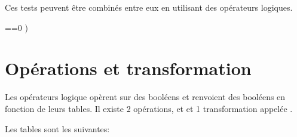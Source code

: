 \documentclass[letterpaper,10pt,english]{sphinxmanual}
\begin{document}
\begin{sphinxVerbatim}[commandchars=\\\{\}]
\PYG{p}{[}\PYG{p}{]}\PYG{p}{[}\PYG{p}{]}
\end{sphinxVerbatim}

\begin{sphinxVerbatim}[commandchars=\\\{\}]
\PYG{p}{[}\PYG{p}{]}\PYG{p}{[}\PYG{p}{]}
\end{sphinxVerbatim}

\begin{sphinxVerbatim}[commandchars=\\\{\}]
  \PYG{p}{[}  \PYG{p}{]}
\end{sphinxVerbatim}

Ces tests peuvent être combinés entre eux en utilisant des opérateurs logiques.

\begin{sphinxVerbatim}[commandchars=\\\{\}]
  

      ==0 )
\end{sphinxVerbatim}


\section{Opérations et transformation}
\label{\detokenize{src/OCI03_Booleans_IfBlock:operations-et-transformation}}
Les opérateurs logique opèrent sur des booléens et renvoient des booléens en fonction de leurs tables.
Il existe 2 opérations,  et  et 1 transformation appelée .

Les tables sont les suivantes:
\end{document}

